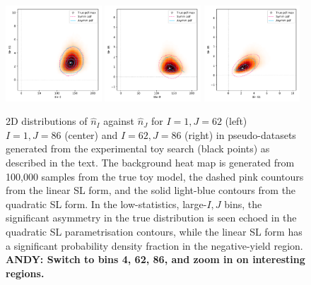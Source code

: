 \documentclass[11pt]{article}
\begin{document}
\begin{figure}%
\centering
\includegraphics[width=0.32\textwidth]{figures/corr-0-61}
\includegraphics[width=0.32\textwidth]{figures/corr-0-85}
\includegraphics[width=0.32\textwidth]{figures/corr-61-85}
\caption{2D distributions of $\hat{n}_{I}$ against $\hat{n}_{J}$ for $I=1,J=62$
  (left) $I=1,J=86$ (center) and $I=62,J=86$ (right) in pseudo-datasets
  generated from the experimental toy search (black points) as described in the
  text. The background heat map is generated from 100,000 samples from the true
  toy model, the dashed pink countours from the linear SL form, and the solid
  light-blue contours from the quadratic SL form. In the low-statistics, large-$I,J$
  bins, the significant asymmetry in the true distribution is seen echoed in the
  quadratic SL parametrisation contours, while the linear SL form has a significant
  probability density fraction in the negative-yield region.
  \textbf{\color{red} ANDY: Switch to bins 4, 62, 86, and zoom in on interesting regions.}
  }
\end{figure}
\end{document}
